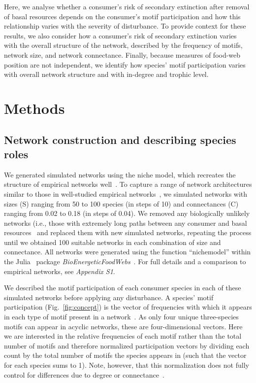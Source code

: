 \documentclass[12pt]{article}
\begin{document}
\begin{spacing}{2.0}
    
    Here, we analyse whether a consumer's risk of secondary extinction after removal of basal resources depends on the consumer's motif participation and how this relationship varies with the severity of disturbance.
    To provide context for these results, we also consider how a consumer's risk of secondary extinction varies with the overall structure of the network, described by the frequency of motifs, network size, and network connectance.
    Finally, because measures of food-web position are not independent, we identify how species' motif participation varies with overall network structure and with in-degree and trophic level.


\section*{Methods}

    \subsection*{Network construction and describing species roles}

        We generated simulated networks using the niche model, which recreates the structure of empirical networks well~\citep{Williams2000,Stouffer2007}.
        To capture a range of network architectures similar to those in well-studied empirical networks~\citep{Dunne2002,Dunne2002e}, we simulated networks with sizes (S) ranging from 50 to 100 species (in steps of 10) and connectances (C) ranging from 0.02 to 0.18 (in steps of 0.04). 
        We removed any biologically unlikely networks (i.e., those with extremely long paths between any consumer and basal resources~\citep{Borrelli2014} and replaced them with new simulated networks, repeating the process until we obtained 100 suitable networks in each combination of size and connectance.
        All networks were generated using the function ``nichemodel'' within the Julia~\citep{Bezanson2017julia} package \emph{BioEnergeticFoodWebs}~\citep{bioenergfw,Delmas2017}.     For full details and a comparison to empirical networks, see \emph{Appendix S1}.

        
        We described the motif participation of each consumer species in each of these simulated networks before applying any disturbance. 
        A species' motif participation (Fig.~\ref{fig:concept}) is the vector of frequencies with which it appears in each type of motif present in a network~\citep{Stouffer2012}.
        As only four unique three-species motifs can appear in acyclic networks, these are four-dimensional vectors. 
        Here we are interested in the relative frequencies of each motif rather than the total number of motifs and therefore normalized participation vectors by dividing each count by the total number of motifs the species appears in (such that the vector for each species sums to 1).
        Note, however, that this normalization does not fully control for differences due to degree or connectance~\citep{Cirtwill2022Oikos}. 



\end{spacing}
\end{document}
